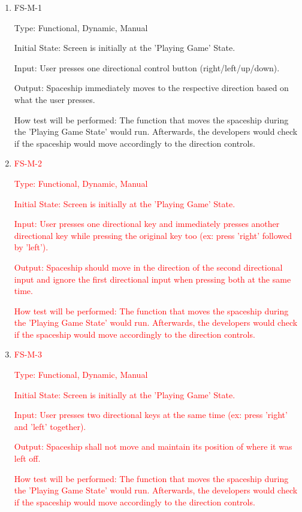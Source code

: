 \documentclass[12pt, titlepage]{article}
\begin{document}
\begin{enumerate}

\item{FS-M-1\\}

Type: Functional, Dynamic, Manual
					
Initial State: Screen is initially at the 'Playing Game' State. 
					
Input: User presses one directional control button (right/left/up/down). 
					
Output: Spaceship immediately moves to the respective direction based on what the user presses.  
					
How test will be performed: The function that moves the spaceship during the 'Playing Game State' would run. Afterwards, the developers would check if the spaceship would move accordingly to the direction controls.

\item\textcolor{red}{FS-M-2\\}

\textcolor{red}{Type: Functional, Dynamic, Manual}

\textcolor{red}{Initial State: Screen is initially at the 'Playing Game' State.}
					
\textcolor{red}{Input: User presses one directional key and immediately presses another directional key while pressing the original key too (ex: press 'right' followed by 'left').}
					
\textcolor{red}{Output: Spaceship should move in the direction of the second directional input and ignore the first directional input when pressing both at the same time.}

\textcolor{red}{How test will be performed: The function that moves the spaceship during the 'Playing Game State' would run. Afterwards, the developers would check if the spaceship would move accordingly to the direction controls.}

\item\textcolor{red}{FS-M-3\\}

\textcolor{red}{Type: Functional, Dynamic, Manual}

\textcolor{red}{Initial State: Screen is initially at the 'Playing Game' State.}
					
\textcolor{red}{Input: User presses two directional keys at the same time (ex: press 'right' and 'left' together).}
					
\textcolor{red}{Output: Spaceship shall not move and maintain its position of where it was left off.}

\textcolor{red}{How test will be performed: The function that moves the spaceship during the 'Playing Game State' would run. Afterwards, the developers would check if the spaceship would move accordingly to the direction controls.}

\end{enumerate}
\end{document}
